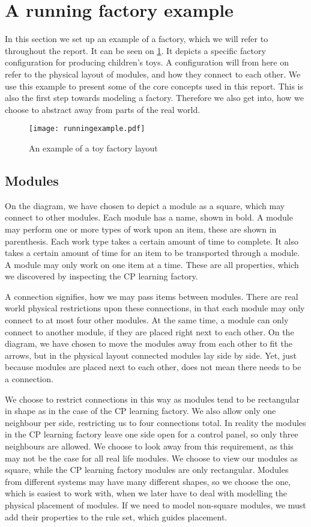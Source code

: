 \section{A running factory example}\label{sec:runningexample}
In this section we set up an example of a factory, which we will refer to throughout the report. It can be seen on \cref{fig:running-example}. It depicts a specific factory configuration for producing children's toys. A configuration will from here on refer to the physical layout of modules, and how they connect to each other. We use this example to present some of the core concepts used in this report. This is also the first step towards modeling a factory. Therefore we also get into, how we choose to abstract away from parts of the real world. 

\begin{figure}[h]
\centering
\texttt{[image: runningexample.pdf]}
\caption{An example of a toy factory layout}
\label{fig:running-example}
\end{figure}

\subsection{Modules}
On the diagram, we have chosen to depict a module as a square, which may connect to other modules. Each module has a name, shown in bold. A module may perform one or more types of work upon an item, these are shown in parenthesis. Each work type takes a certain amount of time to complete. It also takes a certain amount of time for an item to be transported through a module. A module may only work on one item at a time. These are all properties, which we discovered by inspecting the CP learning factory.

A connection signifies, how we may pass items between modules. There are real world physical restrictions upon these connections, in that each module may only connect to at most four other modules. At the same time, a module can only connect to another module, if they are placed right next to each other. On the diagram, we have chosen to move the modules away from each other to fit the arrows, but in the physical layout connected modules lay side by side. Yet, just because modules are placed next to each other, does not mean there needs to be a connection.

We choose to restrict connections in this way as modules tend to be rectangular in shape as in the case of the CP learning factory. We also allow only one neighbour per side, restricting us to four connections total. In reality the modules in the CP learning factory leave one side open for a control panel, so only three neighbours are allowed. We choose to look away from this requirement, as this may not be the case for all real life modules. We choose to view our modules as square, while the CP learning factory modules are only rectangular. Modules from different systems may have many different shapes, so we choose the one, which is easiest to work with, when we later have to deal with modelling the physical placement of modules. If we need to model non-square modules, we must add their properties to the rule set, which guides placement. 

